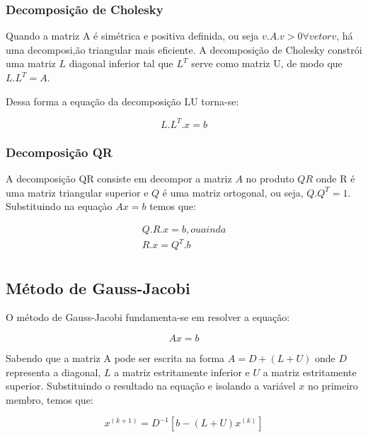 \documentclass[a4paper,10pt]{report}
\begin{document}
\subsubsection{Decomposição de Cholesky}
Quando a matriz A é simétrica e positiva definida, ou seja $v.A.v > 0 \forall vetor v$, há uma decomposi,ão triangular mais eficiente. A decomposição de Cholesky constrói uma matriz $L$ diagonal inferior tal que $L^{T}$ serve como matriz U, de modo que $L.L^{T} = A$.

Dessa forma a equação da decomposição LU torna-se:

\begin{equation*}
L.L^{T}.x = b
\end{equation*}

\subsubsection{Decomposição QR}

A decomposição QR consiste em decompor a matriz $A$ no produto $QR$ onde R é
uma matriz triangular superior e $Q$ é uma matriz ortogonal, ou seja, $Q.Q^{T}
= 1$. Substituindo na equaçào $Ax = b$ temos que:

\begin{equation*}
\begin{gather*}
Q.R.x = b, ou ainda \\
R.x = Q^{T}.b\\
\end{gather*}
\end{equation*}

\subsection{Método de Gauss-Jacobi}

O método de Gauss-Jacobi fundamenta-se em resolver a equação:

\begin{equation*}
Ax = b
\end{equation*}

Sabendo que a matriz A pode ser escrita na forma $ A = D + (L + U) $ onde $D$ representa a diagonal, $L$ a matriz estritamente inferior e $U$ a matriz estritamente superior. Substituindo o resultado na equação e isolando a variável $x$ no primeiro membro, temos que:

\begin{equation*}
x^{(k+1)}=D^{-1}[b-(L+U)x^{(k)}]
\end{equation*}
\end{document}
